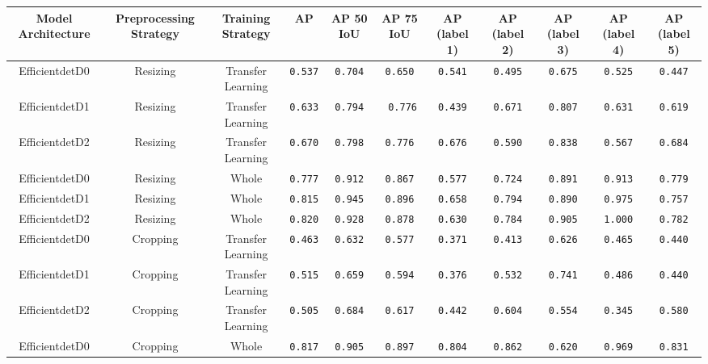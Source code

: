 \documentclass[openright]{normas-utf-tex} %
\begin{document}
\begin{table}[H]
	\centering
	\begin{adjustbox}{width=1\textwidth}
	\label{tab:modelPerformance}
	\begin{tabular}{c|c|c|c|c|c|c|c|c|c|c}
		\hline 
		Model Architecture & Preprocessing Strategy & Training Strategy & AP & AP 50 IoU & AP 75 IoU & AP (label 1) & AP (label 2) & AP (label 3) & AP (label 4) & AP (label 5) \\
		\hline
        Efficientdet\-D0 & Resizing & Transfer Learning & \texttt{0.537} & \texttt{0.704} & \texttt{0.650} & \texttt{0.541} & \texttt{0.495} & \texttt{0.675} & \texttt{0.525} & \texttt{0.447} \\
		Efficientdet\-D1 & Resizing & Transfer Learning & \texttt{0.633} & \texttt{0.794} & \texttt{ 0.776} & \texttt{0.439} & \texttt{0.671} & \texttt{0.807} & \texttt{0.631} & \texttt{0.619} \\
		Efficientdet\-D2 & Resizing & Transfer Learning & \texttt{0.670} & \texttt{0.798} & \texttt{0.776} & \texttt{0.676} & \texttt{0.590} & \texttt{0.838} & \texttt{0.567} & \texttt{0.684} \\
		Efficientdet\-D0 & Resizing & Whole & \texttt{0.777} & \texttt{0.912} & \texttt{0.867} & \texttt{0.577} & \texttt{0.724} & \texttt{0.891} & \texttt{0.913} & \texttt{0.779} \\
		Efficientdet\-D1 & Resizing & Whole & \texttt{0.815} & \texttt{0.945} & \texttt{0.896} & \texttt{0.658} & \texttt{0.794} & \texttt{0.890} & \texttt{0.975} & \texttt{0.757} \\
		Efficientdet\-D2 & Resizing & Whole & \texttt{0.820} & \texttt{0.928} & \texttt{0.878} & \texttt{0.630} & \texttt{0.784} & \texttt{0.905} & \texttt{1.000} & \texttt{0.782} \\
		Efficientdet\-D0 & Cropping & Transfer Learning & \texttt{0.463} & \texttt{0.632} & \texttt{0.577} & \texttt{0.371} & \texttt{0.413} & \texttt{0.626} & \texttt{0.465} & \texttt{0.440} \\
		Efficientdet\-D1 & Cropping & Transfer Learning & \texttt{0.515} & \texttt{0.659} & \texttt{0.594} & \texttt{0.376} & \texttt{0.532} & \texttt{0.741} & \texttt{0.486} & \texttt{0.440} \\
		Efficientdet\-D2 & Cropping & Transfer Learning & \texttt{0.505} & \texttt{0.684} & \texttt{0.617} & \texttt{0.442} & \texttt{0.604} & \texttt{0.554} & \texttt{0.345} & \texttt{0.580} \\
		Efficientdet\-D0 & Cropping & Whole & \texttt{0.817} & \texttt{0.905} & \texttt{0.897} & \texttt{0.804} & \texttt{0.862} & \texttt{0.620} & \texttt{0.969} & \texttt{0.831} \\

\end{tabular}
\end{adjustbox}
\end{table}
\end{document}
